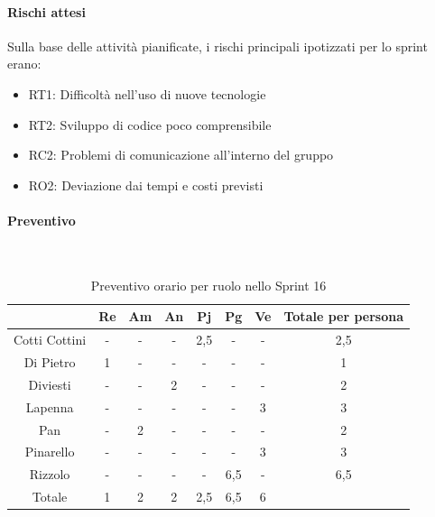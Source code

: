 \documentclass{article}
\begin{document}
            \paragraph{Rischi attesi}
            Sulla base delle attività pianificate, i rischi principali ipotizzati per lo sprint erano:
            \begin{itemize}
                \item RT1: Difficoltà nell’uso di nuove tecnologie
                \item RT2: Sviluppo di codice poco comprensibile
                \item RC2: Problemi di comunicazione all’interno del gruppo
                \item RO2: Deviazione dai tempi e costi previsti
            \end{itemize}

            \paragraph{Preventivo}\mbox{}\\
            \begin{table}[H]
                \centering
                \begin{tabular}{|c|c|c|c|c|c|c|c|}
                \hline
                              & Re  & Am  & An  & Pj  & Pg  & Ve  & Totale per persona \\ \hline
                Cotti Cottini & -   & -   & -   & 2,5 & -   & -   & 2,5                \\ \hline
                Di Pietro     & 1   & -   & -   & -   & -   & -   & 1                  \\ \hline
                Diviesti      & -   & -   & 2   & -   & -   & -   & 2                  \\ \hline
                Lapenna       & -   & -   & -   & -   & -   & 3   & 3                  \\ \hline
                Pan           & -   & 2   & -   & -   & -   & -   & 2                  \\ \hline
                Pinarello     & -   & -   & -   & -   & -   & 3   & 3                  \\ \hline
                Rizzolo       & -   & -   & -   & -   & 6,5 & -   & 6,5                \\ \hline
                Totale        & 1   & 2   & 2   & 2,5 & 6,5 & 6   &                    \\ \hline
                \end{tabular}
                \caption{Preventivo orario per ruolo nello Sprint 16}
            \end{table}
\end{document}
